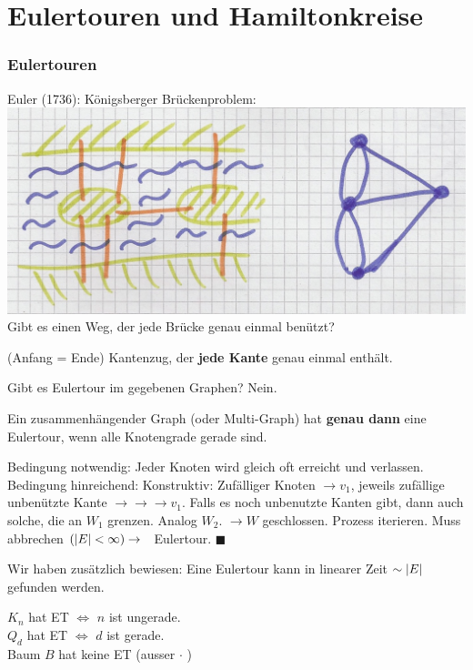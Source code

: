 \section{Eulertouren und Hamiltonkreise}
\subsubsection{Eulertouren}
Euler (1736): Königsberger Brückenproblem: \\
\includegraphics[width=\textwidth]{Bild49} \\
Gibt es einen Weg, der jede Brücke genau einmal benützt? \\
\begin{def*}[note = Eulertour (ET) , index = Eulertour]
	 (Anfang = Ende) Kantenzug, der \textbf{jede Kante} genau einmal enthält.
\end{def*}
Gibt es Eulertour im gegebenen Graphen? Nein. \\
\begin{satz*}[note = (Euler)]
	Ein zusammenhängender Graph (oder Multi-Graph) hat \textbf{genau dann} eine Eulertour, wenn alle Knotengrade gerade sind.\\
	\begin{bew}
		Bedingung notwendig: Jeder Knoten wird gleich oft erreicht und verlassen. \\
		Bedingung hinreichend: Konstruktiv: Zufälliger Knoten $\rightarrow v_1$, jeweils zufällige unbenützte Kante $\rightarrow\rightarrow\rightarrow v_1$. Falls es noch unbenutzte Kanten gibt, dann auch solche, die an $W_1$ grenzen. Analog $W_2$. $\rightarrow W$ geschlossen. Prozess iterieren. Muss abbrechen $(\abs{E} < \infty) \rightarrow$ Eulertour. $\blacksquare$
	\end{bew}
	Wir haben zusätzlich bewiesen: Eine Eulertour kann in linearer Zeit $\sim \abs{E}$ gefunden werden.
\end{satz*}
\begin{bsp*}
	$K_n$ hat ET $\iff$ $n$ ist ungerade. \\
	$Q_d$ hat ET $\iff$ $d$ ist gerade. \\
	Baum $B$ hat keine ET (ausser $\cdot$ )
\end{bsp*}

